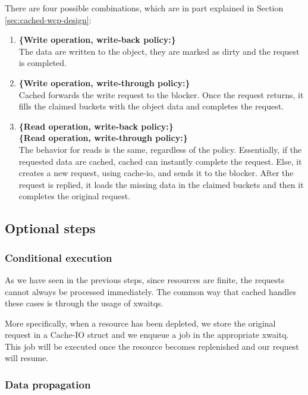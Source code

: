 There are four possible combinations, which are in part explained in Section 
\ref{sec:cached-wcp-design}:

\begin{enumerate}
	\item \textbf{\{Write operation, write-back policy:\}} \hfill \\
		The data are written to the object, they are marked as dirty 
		and the request is completed.
	\item \textbf{\{Write operation, write-through policy:\}} \hfill \\
		Cached forwards the write request to the blocker. Once the 
		request returns, it fills the claimed buckets with the object 
		data and completes the request.
	\item \textbf{\{Read operation, write-back policy:\}} \hfill \\
		\textbf{\{Read operation, write-through policy:\}} \hfill \\
		The behavior for reads is the same, regardless of the policy.
		Essentially, if the requested data are cached, cached can 
		instantly complete the request. Else, it creates a new request, 
		using cache-io, and sends it to the blocker. After the request 
		is replied, it loads the missing data in the claimed buckets 
		and then it completes the original request.
\end{enumerate}

\subsection{Optional steps}

\subsubsection{Conditional execution}

As we have seen in the previous steps, since resources are finite, the requests 
cannot always be processed immediately. The common way that cached handles 
these cases is through the usage of xwaitqs.

More specifically, when a resource has been depleted, we store the original 
request in a Cache-IO struct and we enqueue a job in the appropriate xwaitq.  
This job will be executed once the resource becomes replenished and our request 
will resume.

\subsubsection{Data propagation}

